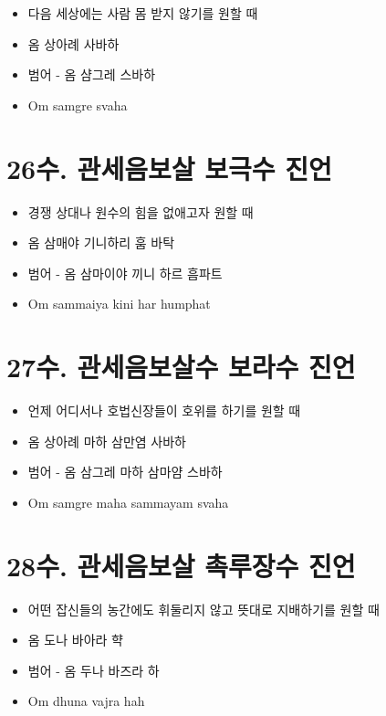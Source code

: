 \documentclass[12pt, a4paper, oneside]{book}
\let\stdsection\section
\renewcommand\section{\newpage\stdsection}
\begin{document}
	 		\begin{itemize}
			\item 다음 세상에는 사람 몸 받지 않기를 원할 때
			\item 옴 상아례 사바하
			\item 범어 - 옴 샴그레 스바하
			\item Om samgre svaha
			\end{itemize}





\section{26수. 관세음보살 보극수 진언}

	 		\begin{itemize}
			\item 경쟁 상대나 원수의 힘을 없애고자 원할 때
			\item 옴 삼매야 기니하리 훔 바탁
			\item 범어 - 옴 삼마이야 끼니 하르 흠파트
			\item Om sammaiya kini har humphat
			\end{itemize}





\section{27수. 관세음보살수 보라수 진언}

	 		\begin{itemize}
			\item 언제 어디서나 호법신장들이 호위를 하기를 원할 때
			\item 옴 상아례 마하 삼만염 사바하
			\item 범어 - 옴 삼그레 마하 삼마얌 스바하
			\item Om samgre maha sammayam svaha
			\end{itemize}





\section{28수. 관세음보살 촉루장수 진언}

	 		\begin{itemize}
			\item 어떤 잡신들의 농간에도 휘둘리지 않고 뜻대로 지배하기를 원할 때
			\item 옴 도나 바아라 햑
			\item 범어 - 옴 두나 바즈라 하
			\item Om dhuna vajra hah
			\end{itemize}
\end{document}
